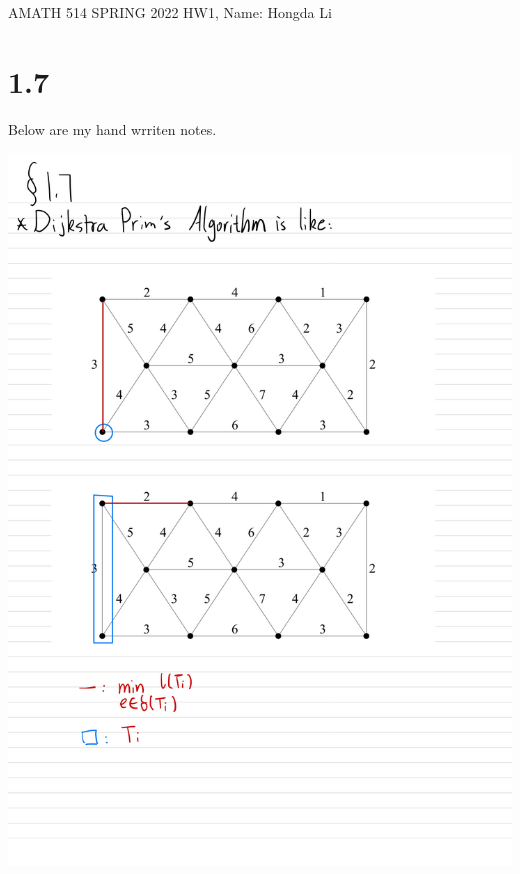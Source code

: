 \documentclass[]{article}
\theoremstyle{definition}
\begin{document}
\begin{center}
    AMATH 514 SPRING 2022 HW1, Name: Hongda Li
\end{center}
\section{1.7}
    Below are my hand wrriten notes. 
    \begin{center}
        \includegraphics[width=14cm]{HW1-4.jpg}
    \end{center}
\end{document}

